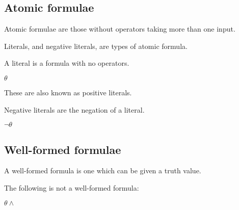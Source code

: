 
\subsection{Atomic formulae}

Atomic formulae are those without operators taking more than one input.

Literals, and negative literals, are types of atomic formula.

A literal is a formula with no operators.

\(\theta \)

These are also known as positive literals.

Negative literals are the negation of a literal.

\(\neg \theta \)

\subsection{Well-formed formulae}

A well-formed formula is one which can be given a truth value.

The following is not a well-formed formula:

\(\theta \land \)

